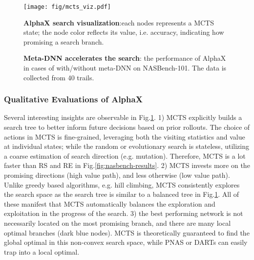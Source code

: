 \documentclass[10pt,twocolumn,letterpaper]{article}
\begin{document}
  

 
  \begin{figure}[t]
  \begin{center}
   \texttt{[image: fig/mcts\_viz.pdf]}
\end{center}
  \caption{\textbf{AlphaX search visualization}:each nodes represents a MCTS state; the node color reflects its value, i.e. accuracy, indicating how promising a search branch.  }
  \vspace{-0.1in}
  \label{fig:mcts_viz}
  \end{figure}
  
  \begin{figure}[t]
    \begin{center}
         \quad
    \end{center}
    \caption{\textbf{Meta-DNN accelerates the search}: the performance of AlphaX in cases of with/without meta-DNN on NASBench-101. The data is collected from 40 trails.}
    \label{fig:nasbench-metadnn}
  \end{figure}
  



\subsubsection{ Qualitative Evaluations of AlphaX }
Several interesting insights are observable in Fig.\ref{fig:mcts_viz}.
1) MCTS explicitly builds a search tree to better inform future decisions based on prior rollouts. The choice of actions in MCTS is fine-grained, leveraging both the visiting statistics and value at individual states; while the random or evolutionary search is stateless, utilizing a coarse estimation of search direction (e.g. mutation). Therefore, MCTS is a lot faster than RS and RE in Fig.\ref{fig:nasbench-results}.
2) MCTS invests more on the promising directions (high value path), and less otherwise (low value path). Unlike greedy based algorithms, e.g. hill climbing, MCTS consistently explores the search space as the search tree is similar to a balanced tree in Fig.\ref{fig:mcts_viz}. All of these manifest that MCTS automatically balances the exploration and exploitation in the progress of the search. 3) the best performing network is not necessarily located on the most promising branch, and there are many local optimal branches (dark blue nodes). MCTS is theoretically guaranteed to find the global optimal in this non-convex search space, while PNAS or DARTs can easily trap into a local optimal.
\end{document}

